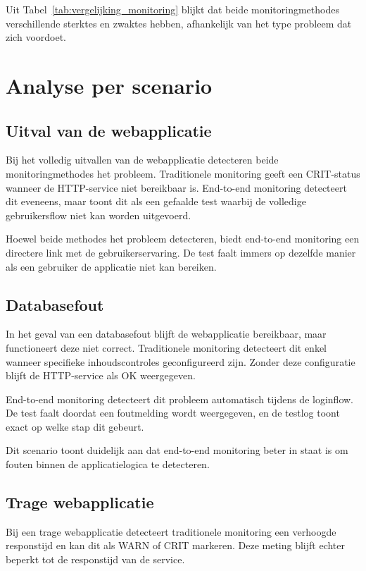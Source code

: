 Uit Tabel~\ref{tab:vergelijking_monitoring} blijkt dat beide monitoringmethodes verschillende sterktes en zwaktes hebben, afhankelijk van het type probleem dat zich voordoet.

\section{Analyse per scenario}

\subsection{Uitval van de webapplicatie}

Bij het volledig uitvallen van de webapplicatie detecteren beide monitoringmethodes het probleem. Traditionele monitoring geeft een CRIT-status wanneer de HTTP-service niet bereikbaar is. End-to-end monitoring detecteert dit eveneens, maar toont dit als een gefaalde test waarbij de volledige gebruikersflow niet kan worden uitgevoerd.

Hoewel beide methodes het probleem detecteren, biedt end-to-end monitoring een directere link met de gebruikerservaring. De test faalt immers op dezelfde manier als een gebruiker de applicatie niet kan bereiken.

\subsection{Databasefout}

In het geval van een databasefout blijft de webapplicatie bereikbaar, maar functioneert deze niet correct. Traditionele monitoring detecteert dit enkel wanneer specifieke inhoudscontroles geconfigureerd zijn. Zonder deze configuratie blijft de HTTP-service als OK weergegeven.

End-to-end monitoring detecteert dit probleem automatisch tijdens de loginflow. De test faalt doordat een foutmelding wordt weergegeven, en de testlog toont exact op welke stap dit gebeurt.

Dit scenario toont duidelijk aan dat end-to-end monitoring beter in staat is om fouten binnen de applicatielogica te detecteren.

\subsection{Trage webapplicatie}

Bij een trage webapplicatie detecteert traditionele monitoring een verhoogde responstijd en kan dit als WARN of CRIT markeren. Deze meting blijft echter beperkt tot de responstijd van de service.

